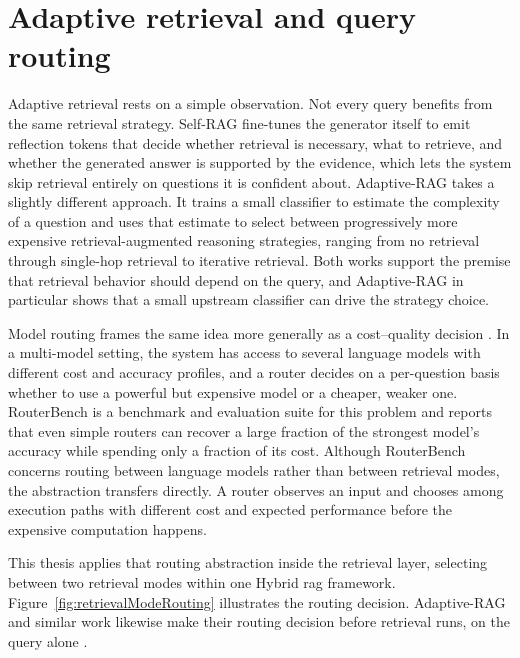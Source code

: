 \documentclass[english, bibtex]{kththesis}               %
\numberwithin{listing}{chapter}
\begin{document}
\section{Adaptive retrieval and query routing}
\label{sec:backgroundAdaptiveRetrieval}

Adaptive retrieval rests on a simple observation. Not every query benefits from the same retrieval strategy. Self-RAG \cite{asai2023selfrag} fine-tunes the generator itself to emit reflection tokens that decide whether retrieval is necessary, what to retrieve, and whether the generated answer is supported by the evidence, which lets the system skip retrieval entirely on questions it is confident about. Adaptive-RAG \cite{jeong2024adaptiverag} takes a slightly different approach. It trains a small classifier to estimate the complexity of a question and uses that estimate to select between progressively more expensive retrieval-augmented reasoning strategies, ranging from no retrieval through single-hop retrieval to iterative retrieval. Both works support the premise that retrieval behavior should depend on the query, and Adaptive-RAG in particular shows that a small upstream classifier can drive the strategy choice.

Model routing frames the same idea more generally as a cost--quality decision \cite{hu2024routerbench}. In a multi-model setting, the system has access to several language models with different cost and accuracy profiles, and a router decides on a per-question basis whether to use a powerful but expensive model or a cheaper, weaker one. RouterBench \cite{hu2024routerbench} is a benchmark and evaluation suite for this problem and reports that even simple routers can recover a large fraction of the strongest model's accuracy while spending only a fraction of its cost. Although RouterBench concerns routing between language models rather than between retrieval modes, the abstraction transfers directly. A router observes an input and chooses among execution paths with different cost and expected performance before the expensive computation happens.

This thesis applies that routing abstraction inside the retrieval layer, selecting between two retrieval modes within one Hybrid \gls{rag} framework. Figure~\ref{fig:retrievalModeRouting} illustrates the routing decision. Adaptive-RAG and similar work likewise make their routing decision before retrieval runs, on the query alone \cite{jeong2024adaptiverag,hu2024routerbench}.
\end{document}
